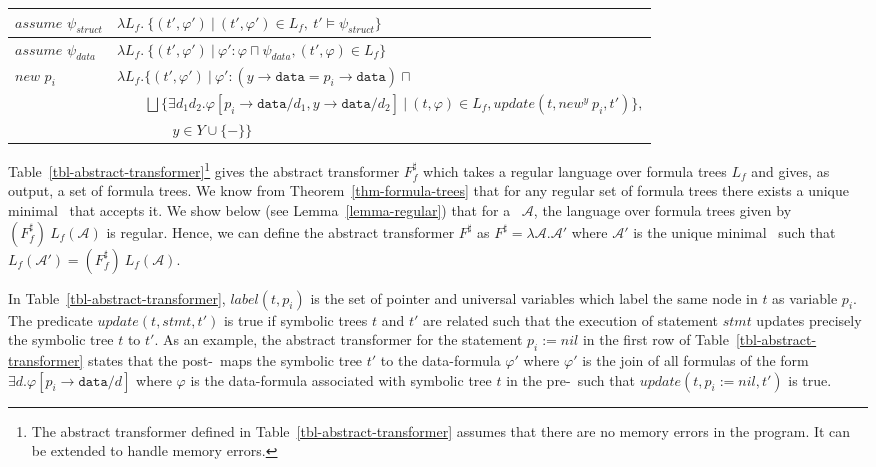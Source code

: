 \documentclass{llncs}
\newcommand{\data}{\texttt{data}}
\begin{document}
\begin{table*}[th]
{\begin{tabular}{| l | l |}
$\textit{assume } \psi_{\mathit{struct}}$ & $\lambda L_f.~ \big\{(t', \varphi') ~|~ (t', \varphi') \in L_f, ~t' \models \psi_{\mathit{struct}} \big\}$ \\\hline



$\textit{assume } \psi_{\mathit{data}} $ & $\lambda L_f.~ \big\{(t', \varphi') ~|~ \varphi': \varphi \sqcap \psi_{\mathit{data}}, (t', \varphi) \in L_f \big\}$ \\\hline

$\textit{new } p_i$ & $
\lambda L_f. \big\{ (t', \varphi') ~ | ~ \varphi':  (y\rightarrow\data = p_i\rightarrow\data) \sqcap$ \\
& $~~~~~~~~~ \bigsqcup \{ \exists d_1 d_2. \varphi[p_i\rightarrow\data/d_1, y\rightarrow\data/d_2] ~|~ (t, \varphi) \in L_f, update(t, new^y~p_i, t') \},$\\
& $~~~~~~~~~~~~~~~~~~y \in Y \cup \{-\}  \big\}$ \\\hline


\end{tabular}}
\caption{Abstract Transformer $F_f^\sharp$. The abstract transformer $F^\sharp = \lambda \mathcal{A}. \mathcal{A'}$ where $\mathcal{A'}$ is the unique minimal \QSDA\ such that $L_f(\mathcal{A'}) = (F_f^\sharp) ~L_f(\mathcal{A})$. The predicate $update$ and the set $label$ are defined below.}
\label{tbl-abstract-transformer}
\end{table*}

Table~\ref{tbl-abstract-transformer}\footnote{The abstract transformer defined in Table~\ref{tbl-abstract-transformer} assumes that there are no memory errors in the program. It can be extended to handle memory errors.} gives the abstract transformer $F_f^\sharp$ which takes a regular language over formula trees $L_f$ and gives, as output, a set of formula trees. We know from Theorem~\ref{thm-formula-trees} that for any regular set of formula trees there exists a unique minimal \QSDA\ that accepts it. We show below (see Lemma~\ref{lemma-regular}) that for a \QSDA\ $\mathcal{A}$, the language over formula trees given by $(F_f^\sharp) ~L_f(\mathcal{A})$ is regular. Hence, we can define the abstract transformer $F^\sharp$ as $F^\sharp = \lambda \mathcal{A}. \mathcal{A'}$ where $\mathcal{A'}$ is the unique minimal \QSDA\ such that $L_f(\mathcal{A'}) = (F_f^\sharp) ~L_f(\mathcal{A})$.



In Table~\ref{tbl-abstract-transformer}, $label(t, p_i)$ is the set of pointer and universal variables which label the same node in $t$ as variable $p_i$. The predicate $update(t, \mathit{stmt}, t')$ is true if symbolic trees $t$ and $t'$ are related such that the execution of statement $\mathit{stmt}$ updates precisely the symbolic tree $t$ to $t'$.
As an example, the abstract transformer for the statement $p_i := nil$ in the first row of Table~\ref{tbl-abstract-transformer} states that the post-\QSDA\ maps the symbolic tree $t'$ to the data-formula $\varphi'$ where $\varphi'$ is the join of all formulas of the form $\exists d. \varphi[p_i\rightarrow\data/d]$ where $\varphi$ is the data-formula associated with symbolic tree $t$ in the pre-\QSDA\ such that $update(t, p_i := nil, t')$ is true.
\end{document}

